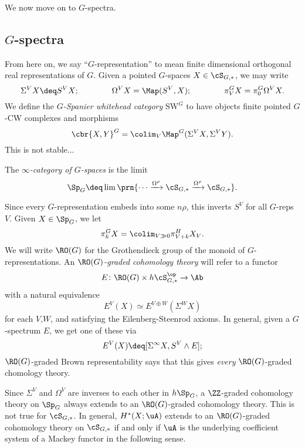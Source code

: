 We now move on to $G$-spectra.

\subsection{\texorpdfstring{$G$}{G}-spectra}%
\def\SW{\mathrm{SW}}
From here on, we say ``$G$-representation'' to mean finite dimensional orthogonal real representations of $G$.
Given a pointed $G$-spaces $X \in \cS_{G,*}$, we may write
\[
  \Sigma^V X \deq S^V X; \hspace{40pt} \Omega^V X = \Map(S^V,X); \hspace{40pt} \pi_V^G X = \pi_0^G \Omega^V X.
\]
We define the \emph{$G$-Spanier whitehead category} $\SW^G$ to have objects finite pointed $G$-CW complexes and morphisms
\[
  \cbr{X,Y}^G = \colim_V \Map^G(\Sigma^V X, \Sigma^V Y).
\]
This is not stable...
\begin{definition}
  The \emph{$\infty$-category of $G$-spaces} is the limit
  \[
    \Sp_G \deq \lim \prn{\cdots \xrightarrow{\Omega^{\rho}} \cS_{G,*} \xrightarrow{\Omega^{\rho}} \cS_{G,*}}.
  \]
\end{definition}
Since every $G$-representation embeds into some $n\rho$, this inverts $S^V$ for all $G$-reps $V$.
Given $X \in \Sp_G$, we let
\[
  \pi_k^G X = \colim_{V \gg 0} \pi_{V +k}^H X_V.
\]
We will write $\RO(G)$ for the Grothendieck group of the monoid of $G$-representations.
An \emph{$\RO(G)$-graded cohomology theory} will refer to a functor
\[
  E\colon  \RO(G) \times h\cS_{G,*}^{\op} \rightarrow \Ab
\]
with a natural equivalence
\[
  E^{V}(X) \simeq E^{V \oplus W}(\Sigma^W X)
\]
for each $V$,$W$, and satisfying the Eilenberg-Steenrod axioms.
In general, given a $G$-spectrum $E$, we get one of these via
\[
  E^V(X) \deq [\Sigma^{\infty} X, S^V\wedge E];
\]
$\RO(G)$-graded Brown representability says that this gives \emph{every} $\RO(G)$-graded chomology theory.

Since $\Sigma^V$ and $\Omega^V$ are inverses to each other in $h\Sp_G$, a $\ZZ$-graded cohomology theory on $\Sp_G$ always extends to an $\RO(G)$-graded cohomology theory. This is not true for $\cS_{G,*}$.
In general, $H^*(X;\uA)$ extends to an $\RO(G)$-graded cohomology theory on $\cS_{G,*}$ if and only if $\uA$ is the underlying coefficient system of a Mackey functor in the following sense.

